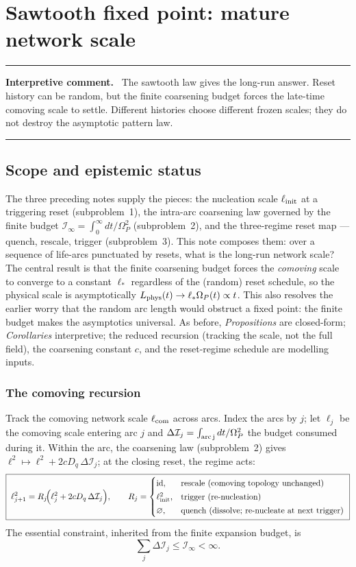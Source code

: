 \documentclass[11pt,a4paper]{article}
\newcommand{\Op}{\Omega_P}
\newcommand{\Dq}{D_q}
\newcommand{\lc}{\ell_{\rm com}}
\newcommand{\Lp}{L_{\rm phys}}
\newcommand{\linit}{\ell_{\rm init}}
\newcommand{\Ib}{\mathcal I}
\newenvironment{commentbox}[1]{\begin{center}\begin{minipage}{0.90\textwidth}\hrule\vspace{0.45em}\textbf{#1.}\ }{\vspace{0.45em}\hrule\end{minipage}\end{center}}
\theoremstyle{plain}
\theoremstyle{definition}
\theoremstyle{remark}
\begin{document}
\section{Sawtooth fixed point: mature network scale}
\begin{commentbox}{Interpretive comment}
The sawtooth law gives the long-run answer.  Reset history can be random, but the finite coarsening budget forces the late-time comoving scale to settle.  Different histories choose different frozen scales; they do not destroy the asymptotic pattern law.
\end{commentbox}
\subsection*{Scope and epistemic status}
The three preceding notes supply the pieces: the nucleation scale $\linit$ at a triggering reset
(subproblem~1), the intra-arc coarsening law governed by the finite budget
$\Ib_\infty=\int_0^\infty dt/\Op^2$ (subproblem~2), and the three-regime reset map --- quench, rescale,
trigger (subproblem~3). This note composes them: over a sequence of life-arcs punctuated by resets, what
is the long-run network scale? The central result is that the finite coarsening budget forces the
\emph{comoving} scale to converge to a constant $\ell_\ast$ regardless of the (random) reset schedule, so
the physical scale is asymptotically $\Lp(t)\to\ell_\ast\Op(t)\propto t$. This also resolves the earlier
worry that the random arc length would obstruct a fixed point: the finite budget makes the asymptotics
universal. As before, \emph{Propositions} are closed-form; \emph{Corollaries} interpretive; the reduced
recursion (tracking the scale, not the full field), the coarsening constant $c$, and the reset-regime
schedule are modelling inputs.

\subsubsection{The comoving recursion}

Track the comoving network scale $\lc$ across arcs. Index the arcs by $j$; let $\ell_j$ be the comoving
scale entering arc $j$ and $\Delta\Ib_j=\int_{\rm arc\,j}dt/\Op^2$ the budget consumed during it. Within
the arc, the coarsening law (subproblem~2) gives $\ell^2\mapsto\ell^2+2c\Dq\,\Delta\Ib_j$; at the closing
reset, the regime acts:
\begin{equation}
\boxed{\;\ell_{j+1}^{2}=R_j\!\Bigl(\ell_j^{2}+2c\Dq\,\Delta\Ib_j\Bigr),
\qquad
R_j=\begin{cases}
\mathrm{id}, & \text{rescale (comoving topology unchanged)}\\[2pt]
\linit^{2}, & \text{trigger (re-nucleation)}\\[2pt]
\varnothing, & \text{quench (dissolve; re-nucleate at next trigger)}
\end{cases}\;}
\end{equation}
The essential constraint, inherited from the finite expansion budget, is
\begin{equation}
\sum_j\Delta\Ib_j\le\Ib_\infty<\infty .
\end{equation}
\end{document}
